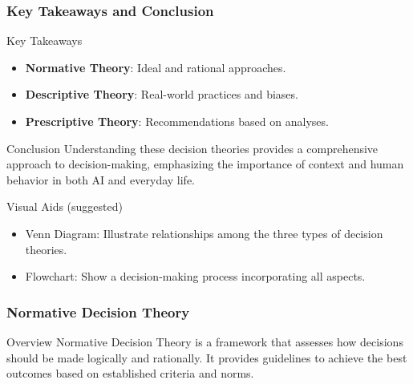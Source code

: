\documentclass[aspectratio=169]{beamer}
\begin{document}
\begin{frame}[fragile]
    \frametitle{Key Takeaways and Conclusion}
    
    \begin{block}{Key Takeaways}
        \begin{itemize}
            \item \textbf{Normative Theory}: Ideal and rational approaches.
            \item \textbf{Descriptive Theory}: Real-world practices and biases.
            \item \textbf{Prescriptive Theory}: Recommendations based on analyses.
        \end{itemize}
    \end{block}
    
    \begin{block}{Conclusion}
        Understanding these decision theories provides a comprehensive approach to decision-making, emphasizing the importance of context and human behavior in both AI and everyday life. 
    \end{block}
    
    \begin{block}{Visual Aids (suggested)}
        \begin{itemize}
            \item Venn Diagram: Illustrate relationships among the three types of decision theories.
            \item Flowchart: Show a decision-making process incorporating all aspects.
        \end{itemize}
    \end{block}
    
\end{frame}

\begin{frame}[fragile]
    \frametitle{Normative Decision Theory}
    \begin{block}{Overview}
        Normative Decision Theory is a framework that assesses how decisions should be made logically and rationally. It provides guidelines to achieve the best outcomes based on established criteria and norms.
    \end{block}
\end{frame}
\end{document}
